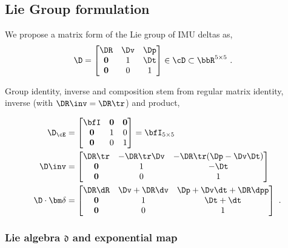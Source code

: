 \subsection{Lie Group formulation}

We propose a matrix form of the Lie group of IMU deltas as,
%
\begin{align}\label{equ:delta_Lie}
\D &= 
\begin{bmatrix}
\DR & \Dv & \Dp \\
\bf0 & 1 & \Dt \\
\bf0 & 0 & 1
\end{bmatrix} \in \cD \subset \bbR^{5\times 5}
~.
\end{align}

Group identity, inverse and composition stem from regular matrix identity, inverse (with $\DR\inv=\DR\tr$) and product,

\begin{align}
\D_\cE&=\begin{bmatrix}
\bfI & \bf0 & \bf0 \\
\bf0 & 1 & 0 \\
\bf0 & 0 & 1 
\end{bmatrix} = \bfI_{5\times5}
\label{equ:identity}
\\
\D\inv &= \begin{bmatrix}
\DR\tr & -\DR\tr\Dv & -\DR\tr(\Dp-\Dv\Dt) \\
\bf0 & 1 & -\Dt \\
\bf0 & 0 & 1
\end{bmatrix} 
\label{equ:inverse}
\\
\D\cdot\bm\delta 
&= 
\begin{bmatrix}
\DR\dR & \Dv + \DR\dv & \Dp+\Dv\dt + \DR\dpp \\
\bf0 & 1 & \Dt+\dt \\
\bf0 & 0 & 1
\end{bmatrix}
~.
\label{equ:composition}
\end{align}
%



\subsubsection{Lie algebra \texorpdfstring{$\mathfrak{d}$}{d} and exponential map}

